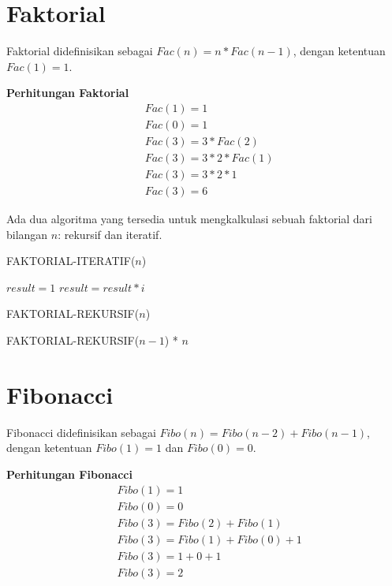 \section{Faktorial}
Faktorial didefinisikan sebagai $Fac(n) =  n * Fac(n-1)$, dengan ketentuan $Fac(1) = 1$. 
\begin{contoh}
	\textbf{Perhitungan Faktorial}
	\begin{align*}
		&Fac(1) = 1\\
		&Fac(0) = 1\\
		&Fac(3) = 3 * Fac(2)\\
		&Fac(3) = 3 * 2 * Fac(1)\\
		&Fac(3) = 3 * 2 * 1\\
		&Fac(3) = 6
	\end{align*}
\end{contoh}

\FloatBarrier
Ada dua algoritma yang tersedia untuk mengkalkulasi sebuah faktorial dari bilangan $n$: rekursif dan iteratif.

\begin{algorithm}[H]
	\caption{FAKTORIAL-ITERATIF($n$)}
	\begin{algorithmic}[1]
		\STATE $result = 1$
			\STATE $result = result * i$
		\ENDFOR
	\end{algorithmic}
\end{algorithm}

\begin{algorithm}[H]
	\caption{FAKTORIAL-REKURSIF($n$)}
	\begin{algorithmic}[1]
		\ELSE
			\RETURN FAKTORIAL-REKURSIF($n-1$) * $n$  
		\ENDIF
	\end{algorithmic}
\end{algorithm}

\FloatBarrier




\section{Fibonacci}
Fibonacci didefinisikan sebagai $Fibo(n) = Fibo(n-2) + Fibo(n-1)$, dengan ketentuan $Fibo(1) = 1$ dan $Fibo(0) = 0$. 
\begin{contoh}
	\textbf{Perhitungan Fibonacci}\\
	\begin{align*}
		&Fibo(1) = 1\\
		&Fibo(0) = 0\\
		&Fibo(3) = Fibo(2) + Fibo(1)\\
		&Fibo(3) = Fibo(1) + Fibo(0) + 1 \\
		&Fibo(3) = 1 + 0 + 1 \\
		&Fibo(3) = 2 \\
	\end{align*}
\end{contoh}

